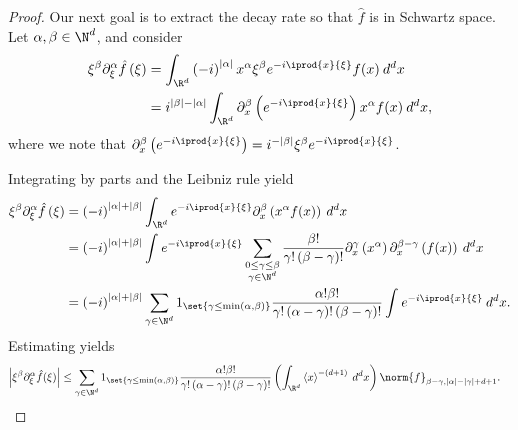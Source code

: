 \documentclass[10pt]{mypackage}
\begin{document}
\begin{proof}
  Our next goal is to extract the decay rate so that $\hat{f}$ is in Schwartz space. Let $\alpha,\beta\in \N^{d}$, and consider
  \begin{align*}
    \xi^{\beta} \partial_{\xi}^{\alpha} \hat{f}\left( \xi \right) &= \int_{\R^d}^{}  \left( -i \right)^{\left\vert \alpha \right\vert}x^{\alpha}\xi^{\beta} e^{-i \iprod{x}{\xi}}f(x)\:d^{d}x\\
                                    &= i^{ \left\vert \beta \right\vert - \left\vert \alpha \right\vert } \int_{\R^d}^{} \partial^{\beta}_{x}\left( e^{- i\iprod{x}{\xi}} \right) x^{\alpha}f(x)\:d^{d}x,
  \end{align*}
  where we note that $\partial^{\beta}_x\left( e^{-i \iprod{x}{\xi}} \right) = i^{- \left\vert \beta \right\vert}\xi^{\beta}e^{-i \iprod{x}{\xi}}$.

  Integrating by parts and the Leibniz rule yield
  \begin{align*}
    \xi^{\beta} \partial^{\alpha}_{\xi} \hat{f}\left( \xi \right) &= \left( -i \right)^{\left\vert \alpha \right\vert + \left\vert \beta \right\vert} \int_{\R^d}^{} e^{-i \iprod{x}{\xi}}\partial^{\beta}_x\left( x^{\alpha}f(x) \right)\:d^{d}x\\
                                    &= \left( -i \right)^{\left\vert \alpha \right\vert + \left\vert \beta \right\vert} \int_{}^{} e^{-i \iprod{x}{\xi}}\sum_{\substack{0\leq \gamma\leq \beta \\ \gamma\in \N^{d}}} \frac{\beta!}{\gamma!\left( \beta-\gamma \right)!} \partial^{\gamma}_x\left( x^{\alpha} \right) \partial^{\beta-\gamma}_x\left( f(x) \right)\:d^{d}x\\
                                    &= \left( -i \right)^{\left\vert \alpha \right\vert + \left\vert \beta \right\vert} \sum_{\gamma\in \N^{d}} 1_{\set{\gamma\leq \min(\alpha,\beta)}} \frac{\alpha!\beta!}{\gamma! \left( \alpha-\gamma \right)! \left( \beta-\gamma \right)!} \int_{}^{} e^{-i \iprod{x}{\xi}} \:d^{d}x.
  \end{align*}
  Estimating yields
  \begin{align*}
    \left\vert \xi^{\beta} \partial^{\alpha}_{\xi} \hat{f}(\xi) \right\vert &\leq \sum_{\gamma\in \N^{d}} 1_{\set{\gamma\leq \min(\alpha,\beta)}} \frac{\alpha!\beta!}{\gamma!\left( \alpha-\gamma \right)!\left( \beta-\gamma \right)!} \left( \int_{\R^d}^{} \left\langle x \right\rangle^{-\left( d+1 \right)}\:d^{d}x \right) \norm{f}_{\beta-\gamma,\left\vert \alpha \right\vert-\left\vert \gamma \right\vert+d+1}.
  \end{align*}

\end{proof}
\end{document}
